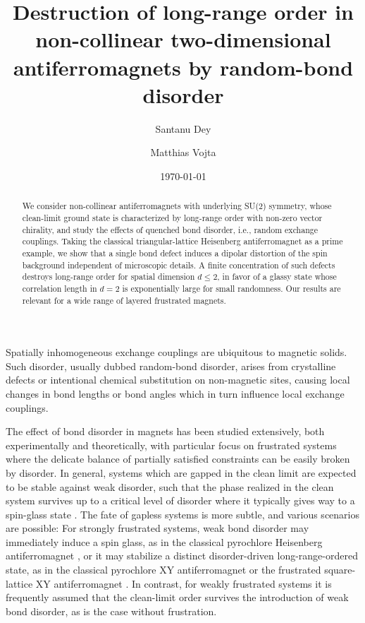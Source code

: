 \documentclass[twocolumn,english,aps,showpacs,prl,floatfix]{revtex4-1}
\begin{document}
\title{
Destruction of long-range order in non-collinear two-dimensional antiferromagnets by random-bond disorder
}

\author{Santanu Dey}
\author{Matthias Vojta}

\begin{abstract}
We consider non-collinear antiferromagnets with underlying SU(2) symmetry, whose clean-limit ground state is characterized by long-range order with non-zero vector chirality, and study the effects of quenched bond disorder, i.e., random exchange couplings. Taking the classical triangular-lattice Heisenberg antiferromagnet as a prime example, we show that a single bond defect induces a dipolar distortion of the spin background independent of microscopic details. A finite concentration of such defects destroys long-range order for spatial dimension $d\leq 2$, in favor of a glassy state whose correlation length in $d=2$ is exponentially large for small randomness. Our results are relevant for a wide range of layered frustrated magnets.
\end{abstract}

\date{\today}
\maketitle


Spatially inhomogeneous exchange couplings are ubiquitous to magnetic solids. Such disorder, usually dubbed random-bond disorder, arises from crystalline defects or intentional chemical substitution on non-magnetic sites, causing local changes in bond lengths or bond angles which in turn influence local exchange couplings.

The effect of bond disorder in magnets has been studied extensively, both experimentally and theoretically, with particular focus on frustrated systems where the delicate balance of partially satisfied constraints can be easily broken by disorder. In general, systems which are gapped in the clean limit are expected to be stable against weak disorder, such that the phase realized in the clean system survives up to a critical level of disorder where it typically gives way to a spin-glass state \cite{villain79}. The fate of gapless systems is more subtle, and various scenarios are possible: For strongly frustrated systems, weak bond disorder may immediately induce a spin glass, as in the classical pyrochlore Heisenberg antiferromagnet \cite{chalker07}, or it may stabilize a distinct disorder-driven long-range-ordered state, as in the classical pyrochlore XY antiferromagnet \cite{zhito14} or the frustrated square-lattice XY antiferromagnet \cite{henley89}. In contrast, for weakly frustrated systems it is frequently assumed that the clean-limit order survives the introduction of weak bond disorder, as is the case without frustration.
\end{document}

